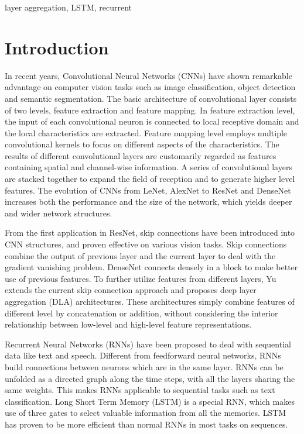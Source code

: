 \documentclass[conference]{IEEEtran}
\begin{document}
\begin{IEEEkeywords}
	layer aggregation, LSTM, recurrent
\end{IEEEkeywords}
	
\section{Introduction}

In recent years, Convolutional Neural Networks (CNNs) have shown remarkable advantage on computer vision tasks such as image classification\cite{imagenet}, object detection\cite{faster-r-cnn} and semantic segmentation\cite{refinenet}. The basic architecture of convolutional layer consists of two levels, feature extraction and feature mapping. In feature extraction level, the input of each convolutional neuron is connected to local receptive domain and the local characteristics are extracted. Feature mapping level employs multiple convolutional kernels to focus on different aspects of the characteristics. The results of different convolutional layers are customarily regarded as features containing spatial and channel-wise information. A series of convolutional layers are stacked together to expand the field of reception and to generate higher level features. The evolution of CNNs from LeNet\cite{lenet}, AlexNet\cite{alexnet} to ResNet\cite{resnet} and DenseNet\cite{densenet} increases both the performance and the size of the network, which yields deeper and wider network structures.

From the first application in ResNet\cite{resnet}, skip connections have been introduced into CNN structures, and proven effective on various vision tasks. Skip connections combine the output of previous layer and the current layer to deal with the gradient vanishing problem. DenseNet\cite{densenet} connects densely in a block to make better use of previous features. To further utilize features from different layers, Yu\cite{dla} extends the current skip connection approach and proposes deep layer aggregation (DLA) architectures. These architectures simply combine features of different level by concatenation or addition, without considering the interior relationship between low-level and high-level feature representations. 

Recurrent Neural Networks (RNNs)\cite{rnn} have been proposed to deal with sequential data like text and speech. Different from feedforward neural networks, RNNs build connections between neurons which are in the same layer. RNNs can be unfolded as a directed graph along the time steps, with all the layers sharing the same weights. This makes RNNs applicable to sequential tasks such as text classification. Long Short Term Memory (LSTM)\cite{lstm} is a special RNN, which makes use of three gates to select valuable information from all the memories. LSTM has proven to be more efficient than normal RNNs in most tasks on sequences.
\end{document}
